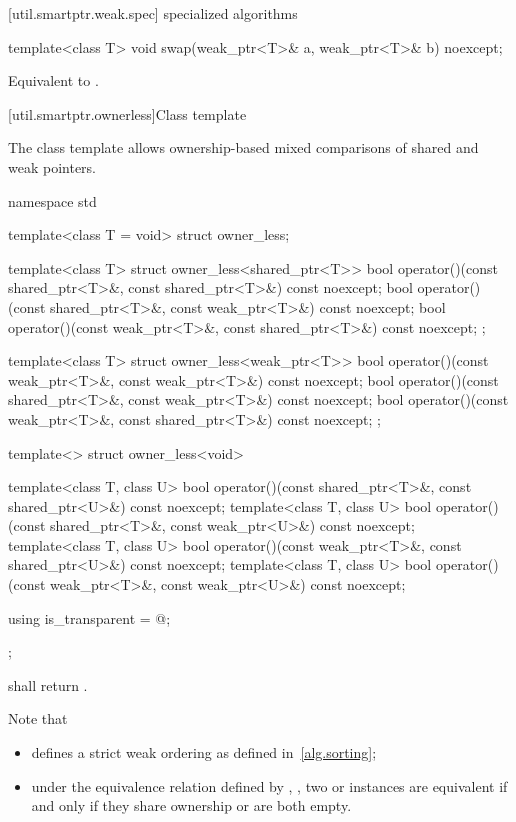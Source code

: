 [util.smartptr.weak.spec]{ specialized algorithms}

%
\begin{itemdecl}
template<class T>
  void swap(weak_ptr<T>& a, weak_ptr<T>& b) noexcept;
\end{itemdecl}

\begin{itemdescr}
\pnum\effects Equivalent to .
\end{itemdescr}

[util.smartptr.ownerless]{Class template }

\pnum
The class template  allows ownership-based mixed comparisons of shared
and weak pointers.

%
\begin{codeblock}
namespace std {
  template<class T = void> struct owner_less;

  template<class T> struct owner_less<shared_ptr<T>> {
    bool operator()(const shared_ptr<T>&, const shared_ptr<T>&) const noexcept;
    bool operator()(const shared_ptr<T>&, const weak_ptr<T>&) const noexcept;
    bool operator()(const weak_ptr<T>&, const shared_ptr<T>&) const noexcept;
  };

  template<class T> struct owner_less<weak_ptr<T>> {
    bool operator()(const weak_ptr<T>&, const weak_ptr<T>&) const noexcept;
    bool operator()(const shared_ptr<T>&, const weak_ptr<T>&) const noexcept;
    bool operator()(const weak_ptr<T>&, const shared_ptr<T>&) const noexcept;
  };

  template<> struct owner_less<void> {
    template<class T, class U>
      bool operator()(const shared_ptr<T>&, const shared_ptr<U>&) const noexcept;
    template<class T, class U>
      bool operator()(const shared_ptr<T>&, const weak_ptr<U>&) const noexcept;
    template<class T, class U>
      bool operator()(const weak_ptr<T>&, const shared_ptr<U>&) const noexcept;
    template<class T, class U>
      bool operator()(const weak_ptr<T>&, const weak_ptr<U>&) const noexcept;

    using is_transparent = @\unspec@;
  };
}
\end{codeblock}

%
\pnum {} shall return . \begin{note}
Note that

\begin{itemize}
\item {} defines a strict weak ordering as defined in~\ref{alg.sorting};

\item under the equivalence relation defined by ,
, two  or
 instances are equivalent if and only if they share ownership or are
both empty.
\end{itemize} \end{note}


